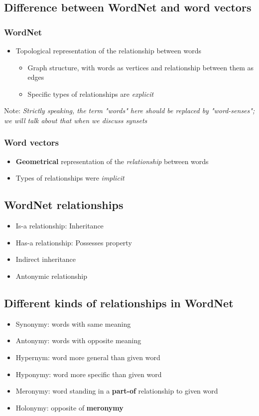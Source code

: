 \documentclass[a4paper]{article}
\begin{document}
\subsection{Difference between WordNet and word vectors}
\subsubsection{WordNet}
\begin{itemize}
    \item Topological representation of the relationship between words
    \begin{itemize}
        \item Graph structure, with words as vertices and relationship between them as edges
        \item Specific types of relationships are \textit{explicit}
    \end{itemize}
\end{itemize}
\noindent Note: \textit{Strictly speaking, the term "words" here should be replaced by "word-senses"; we will talk about that when we discuss synsets}
\subsubsection{Word vectors}
\begin{itemize}
    \item \textbf{Geometrical} representation of the \textit{relationship} between words
    \item Types of relationships were \textit{implicit}
\end{itemize}

\subsection{WordNet relationships}
\begin{itemize}
    \item Is-a relationship: Inheritance
    \item Has-a relationship: Possesses property
    \item Indirect inheritance
    \item Antonymic relationship
\end{itemize}

\subsection{Different kinds of relationships in WordNet}
\begin{itemize}
    \item Synonymy: words with same meaning
    \item Antonymy: words with opposite meaning
    \item Hypernym: word more general than given word
    \item Hyponymy: word more specific than given word
    \item Meronymy: word standing in a \textbf{part-of} relationship to given word
    \item Holonymy: opposite of \textbf{meronymy}
\end{itemize}
\end{document}
